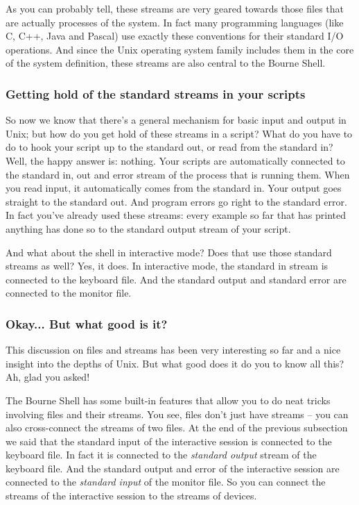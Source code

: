 As you can probably tell, these streams are very geared towards those files
that are actually processes of the system. In fact many programming languages
(like C, C++, Java and Pascal) use exactly these conventions for their standard
I/O operations. And since the Unix operating system family includes them in the
core of the system definition, these streams are also central to the Bourne
Shell.

\subsubsection{Getting hold of the standard streams in your scripts}
So now we know that there's a general mechanism for basic input and output in
Unix; but how do you get hold of these streams in a script? What do you have to
do to hook your script up to the standard out, or read from the standard in?
Well, the happy answer is: nothing. Your scripts are automatically connected to
the standard in, out and error stream of the process that is running them. When
you read input, it automatically comes from the standard in. Your output goes
straight to the standard out. And program errors go right to the standard
error. In fact you've already used these streams: every example so far that has
printed anything has done so to the standard output stream of your script.

And what about the shell in interactive mode? Does that use those standard
streams as well? Yes, it does. In interactive mode, the standard in stream is
connected to the keyboard file. And the standard output and standard error are
connected to the monitor file.

\subsubsection{Okay... But what good is it?}
This discussion on files and streams has been very interesting so far and a
nice insight into the depths of Unix. But what good does it do you to know all
this? Ah, glad you asked!

The Bourne Shell has some built-in features that allow you to do neat tricks
involving files and their streams. You see, files don't just have streams --
you can also cross-connect the streams of two files. At the end of the previous
subsection we said that the standard input of the interactive session is
connected to the keyboard file. In fact it is connected to the \emph{standard
output} stream of the keyboard file. And the standard output and error of the
interactive session are connected to the \emph{standard input} of the monitor
file. So you can connect the streams of the interactive session to the streams
of devices.

